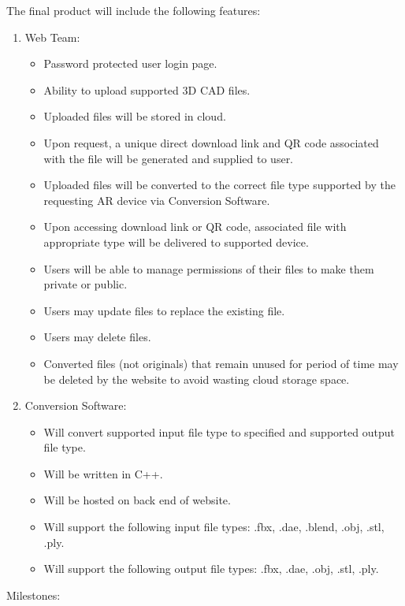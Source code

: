 The final product will include the following features:

\begin{enumerate}
	\item Web Team:
	\begin{itemize}
		\item Password protected user login page. 
		\item Ability to upload supported 3D CAD files. 
		\item Uploaded files will be stored in cloud.
		\item Upon request, a unique direct download link and QR code associated with the file will be generated and supplied to user. 
		\item Uploaded files will be converted to the correct file type supported by the requesting AR device via Conversion Software.
		\item Upon accessing download link or QR code, associated file with appropriate type will be delivered to supported device.
		\item Users will be able to manage permissions of their files to make them private or public.
		\item Users may update files to replace the existing file.
		\item Users may delete files. 
		\item Converted files (not originals) that remain unused for period of time may be deleted by the website to avoid wasting cloud storage space.  
	\end{itemize}
	\item Conversion Software:
	\begin{itemize}
		\item Will convert supported input file type to specified and supported output file type. 
		\item Will be written in C++. 
		\item Will be hosted on back end of website. 
		\item Will support the following input file types: .fbx, .dae, .blend, .obj, .stl, .ply.
		\item Will support the following output file types: .fbx, .dae, .obj, .stl, .ply.
	\end{itemize} 
\end{enumerate}

Milestones:

